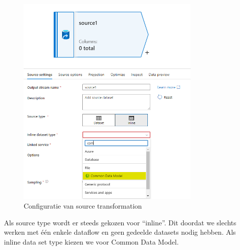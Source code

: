 \begin{figure}[H]
    \centering
    \includegraphics[width=0.8\textwidth]{./graphics/adf/source_table_1_specific.png}
    \caption{Configuratie van source transformation}
\end{figure}

Als source type wordt er steeds gekozen voor ``inline''. Dit doordat we slechts werken met één enkele dataflow en geen gedeelde datasets nodig hebben. Als inline data set type kiezen we voor Common Data Model.

